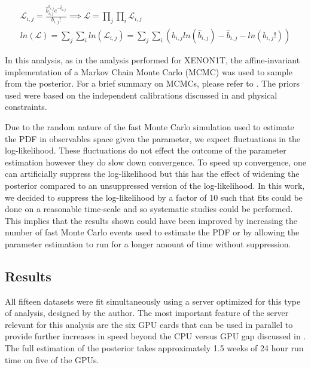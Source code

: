 \begin{equation}
        \label{eqn:nerix_binned_likelihood}
        \begin{gathered}
                \mathcal{L}_{i,j} = \frac{\hat{b}_{i,j}^{b_{i,j}} e^{-\hat{b}_{i,j}}}{b_{i,j}!} \implies \mathcal{L} = \prod_j \prod_i \mathcal{L}_{i,j} \\ 
                ln(\mathcal{L}) = \sum_j \sum_i ln(\mathcal{L}_{i,j}) = \sum_j \sum_i ( b_{i,j} ln(\hat{b}_{i,j}) - \hat{b}_{i,j} - ln(b_{i,j}!) )
        \end{gathered}
\end{equation}


In this analysis, as in the analysis performed for XENON1T, the affine-invariant implementation of a Markov Chain Monte Carlo (MCMC) was used to sample from the posterior.  For a brief summary on MCMCs, please refer to .  The priors used were based on the independent calibrations discussed in  and physical constraints.

Due to the random nature of the fast Monte Carlo simulation used to estimate the PDF in observables space given the parameter, we expect fluctuations in the log-likelihood.  These fluctuations do not effect the outcome of the parameter estimation however they do slow down convergence.  To speed up convergence, one can artificially suppress the log-likelihood but this has the effect of widening the posterior compared to an unsuppressed version of the log-likelihood\cite{anthony2017characterization}.  In this work, we decided to suppress the log-likelihood by a factor of 10 such that fits could be done on a reasonable time-scale and so systematic studies could be performed.  This implies that the results shown could have been improved by increasing the number of fast Monte Carlo events used to estimate the PDF or by allowing the parameter estimation to run for a longer amount of time without suppression. 


\subsection{Results}
\label{sec:nerix_results}

All fifteen datasets were fit simultaneously using a server optimized for this type of analysis, designed by the author.  The most important feature of the server relevant for this analysis are the six GPU cards that can be used in parallel to provide further increases in speed beyond the CPU versus GPU gap discussed in .  The full estimation of the posterior takes approximately 1.5 weeks of 24 hour run time on five of the GPUs.


